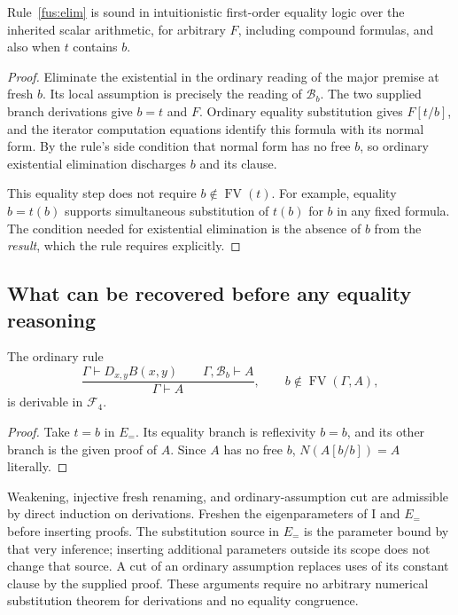 \begin{lemma}
\label{fus:soundness}
Rule~\eqref{fus:elim} is sound in intuitionistic first-order equality logic
over the inherited scalar arithmetic, for arbitrary $F$, including compound
formulas, and also when $t$ contains $b$.
\end{lemma}
\begin{proof}
Eliminate the existential in the ordinary reading of the major premise at
fresh $b$. Its local assumption is precisely the reading of $\mathcal B_b$.
The two supplied branch derivations give $b=t$ and $F$. Ordinary equality
substitution gives $F[t/b]$, and the iterator computation equations identify
this formula with its normal form. By the rule's side condition that normal
form has no free $b$, so ordinary existential elimination discharges $b$ and
its clause.

This equality step does not require $b\notin\operatorname{FV}(t)$.
For example, equality $b=t(b)$ supports simultaneous substitution of $t(b)$
for $b$ in any fixed formula. The condition needed for existential elimination
is the absence of $b$ from the \emph{result}, which the rule requires explicitly.
\end{proof}

\subsection{What can be recovered before any equality reasoning}

\begin{lemma}
\label{fus:ordinary-elim}
The ordinary rule
\[
 \frac{\Gamma\vdash D_{x,y}B(x,y)\qquad
       \Gamma,\mathcal B_b\vdash A}
      {\Gamma\vdash A},\qquad b\notin\operatorname{FV}(\Gamma,A),
\]
is derivable in $\mathcal F_4$.
\end{lemma}
\begin{proof}
Take $t=b$ in $E_{=}$. Its equality branch is reflexivity $b=b$, and its
other branch is the given proof of $A$. Since $A$ has no free $b$,
$N(A[b/b])=A$ literally.
\end{proof}

Weakening, injective fresh renaming, and ordinary-assumption cut are
admissible by direct induction on derivations. Freshen the eigenparameters
of I and $E_{=}$ before inserting proofs. The substitution source in
$E_{=}$ is the parameter bound by that very inference; inserting additional
parameters outside its scope does not change that source. A cut of an
ordinary assumption replaces uses of its constant clause by the supplied
proof. These arguments require no arbitrary numerical substitution theorem
for derivations and no equality congruence.

